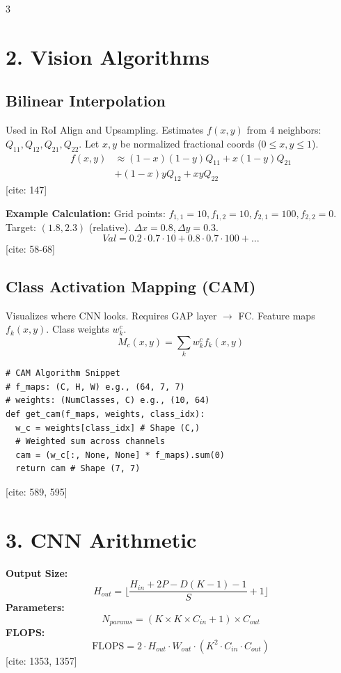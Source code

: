 \documentclass[10pt,landscape]{article}
\begin{document}
\begin{multicols*}{3}
\section*{2. Vision Algorithms}

\subsection*{Bilinear Interpolation}
Used in RoI Align and Upsampling. Estimates $f(x,y)$ from 4 neighbors: $Q_{11}, Q_{12}, Q_{21}, Q_{22}$.
Let $x, y$ be normalized fractional coords ($0 \le x, y \le 1$).
\begin{align*}
    f(x,y) &\approx (1-x)(1-y)Q_{11} + x(1-y)Q_{21} \\
           &+ (1-x)y Q_{12} + xy Q_{22}
\end{align*}
[cite: 147]

\textbf{Example Calculation:}
Grid points: $f_{1,1}=10, f_{1,2}=10, f_{2,1}=100, f_{2,2}=0$. Target: $(1.8, 2.3)$ (relative).
$\Delta x = 0.8, \Delta y = 0.3$.
$$ Val = 0.2 \cdot 0.7 \cdot 10 + 0.8 \cdot 0.7 \cdot 100 + \dots $$
[cite: 58-68]

\subsection*{Class Activation Mapping (CAM)}
Visualizes where CNN looks. Requires GAP layer $\to$ FC.
Feature maps $f_k(x,y)$. Class weights $w_k^c$.
$$ M_{c}(x,y) = \sum_k w_k^c f_k(x,y) $$
\begin{lstlisting}
# CAM Algorithm Snippet
# f_maps: (C, H, W) e.g., (64, 7, 7)
# weights: (NumClasses, C) e.g., (10, 64)
def get_cam(f_maps, weights, class_idx):
  w_c = weights[class_idx] # Shape (C,)
  # Weighted sum across channels
  cam = (w_c[:, None, None] * f_maps).sum(0)
  return cam # Shape (7, 7)
\end{lstlisting}
[cite: 589, 595]

\section*{3. CNN Arithmetic}

\textbf{Output Size:}
$$ H_{out} = \lfloor \frac{H_{in} + 2P - D(K-1) - 1}{S} + 1 \rfloor $$
\textbf{Parameters:}
$$ N_{params} = (K \times K \times C_{in} + 1) \times C_{out} $$
\textbf{FLOPS:}
$$ \text{FLOPS} = 2 \cdot H_{out} \cdot W_{out} \cdot (K^2 \cdot C_{in} \cdot C_{out}) $$
[cite: 1353, 1357]


\end{multicols*}
\end{document}
